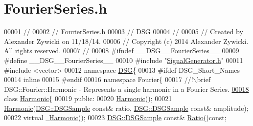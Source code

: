 \hypertarget{_fourier_series_8h_source}{\section{Fourier\+Series.\+h}
\label{_fourier_series_8h_source}
}

\begin{DoxyCode}
00001 \textcolor{comment}{//}
00002 \textcolor{comment}{//  FourierSeries.h}
00003 \textcolor{comment}{//  DSG}
00004 \textcolor{comment}{//}
00005 \textcolor{comment}{//  Created by Alexander Zywicki on 11/18/14.}
00006 \textcolor{comment}{//  Copyright (c) 2014 Alexander Zywicki. All rights reserved.}
00007 \textcolor{comment}{//}
00008 \textcolor{preprocessor}{#ifndef \_\_DSG\_\_FourierSeries\_\_}
00009 \textcolor{preprocessor}{#define \_\_DSG\_\_FourierSeries\_\_}
00010 \textcolor{preprocessor}{#include "\hyperlink{_signal_generator_8h}{SignalGenerator.h}"}
00011 \textcolor{preprocessor}{#include <vector>}
00012 \textcolor{keyword}{namespace }\hyperlink{namespace_d_s_g}{DSG}\{
00013 \textcolor{preprocessor}{#ifdef DSG\_Short\_Names}
00014     \textcolor{keyword}{inline}
00015 \textcolor{preprocessor}{#endif}
00016     \textcolor{keyword}{namespace }Fourier\{\textcolor{comment}{}
00017 \textcolor{comment}{        //!\(\backslash\)brief DSG::Fourier::Harmonic - Represents a single harmonic in a Fourier Series.}
\hypertarget{_fourier_series_8h_source_l00018}{}\hyperlink{class_d_s_g_1_1_fourier_1_1_harmonic}{00018} \textcolor{comment}{}        \textcolor{keyword}{class }\hyperlink{class_d_s_g_1_1_fourier_1_1_harmonic}{Harmonic}\{
00019         \textcolor{keyword}{public}:
00020             \hyperlink{class_d_s_g_1_1_fourier_1_1_harmonic_a5433617eaac39402d27ce24634140940}{Harmonic}();
00021             \hyperlink{class_d_s_g_1_1_fourier_1_1_harmonic_a5433617eaac39402d27ce24634140940}{Harmonic}(\hyperlink{namespace_d_s_g_ac39a94cd27ebcd9c1e7502d0c624894a}{DSG::DSGSample} \textcolor{keyword}{const}& ratio,
      \hyperlink{namespace_d_s_g_ac39a94cd27ebcd9c1e7502d0c624894a}{DSG::DSGSample} \textcolor{keyword}{const}& amplitude);
00022             \textcolor{keyword}{virtual} \hyperlink{class_d_s_g_1_1_fourier_1_1_harmonic_aad4e5d3e4ef8cd53bf01b0624246b826}{~Harmonic}();
00023             \hyperlink{namespace_d_s_g_ac39a94cd27ebcd9c1e7502d0c624894a}{DSG::DSGSample} \textcolor{keyword}{const}& \hyperlink{class_d_s_g_1_1_fourier_1_1_harmonic_a26b2ccbb2f25f72040a555c51dc43672}{Ratio}()\textcolor{keyword}{const};

\end{DoxyCode}
